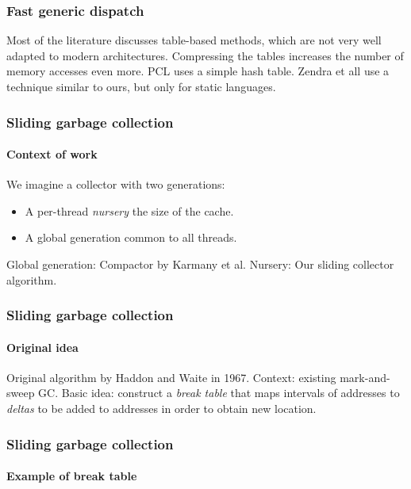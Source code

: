 \documentclass{beamer}
\def\inputfig#1{}
\begin{document}
\begin{frame}
  \frametitle{Fast generic dispatch}

  Most of the literature discusses table-based methods, which are not
  very well adapted to modern architectures.  Compressing the tables
  increases the number of memory accesses even more.
  \vskip 0.5cm
  PCL uses a simple hash table.
  \vskip 0.5cm
  Zendra et all use a technique similar to ours, but only for static
  languages.   

\end{frame}
\begin{frame}
  \frametitle{Sliding garbage collection}
  \framesubtitle{Context of work}

  We imagine a collector with two generations:

  \begin{itemize}
  \item A per-thread \emph{nursery} the size of the cache.
  \item A global generation common to all threads.
  \end{itemize}

Global generation: Compactor by Karmany et al.
\vskip 0.25cm
Nursery: Our sliding collector algorithm.

\end{frame}
\begin{frame}
  \frametitle{Sliding garbage collection} 
  \framesubtitle{Original idea}

  Original algorithm by Haddon and Waite in 1967.
  \vskip 0.5cm
  Context: existing mark-and-sweep GC.
  \vskip 0.5cm
  Basic idea: construct a \emph{break table} that maps intervals of
  addresses to \emph{deltas} to be added to addresses in order to
  obtain new location. 

\end{frame}
\begin{frame}
  \frametitle{Sliding garbage collection} 
  \framesubtitle{Example of break table}
  \begin{center}
\inputfig{fig-example-aa.pdf_t}
  \end{center}

  \begin{center}
\inputfig{fig-example-da.pdf_t}
  \end{center}

\end{frame}
\end{document}
